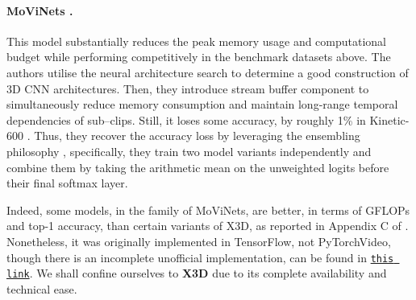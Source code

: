 \paragraph{MoViNets \cite{MoViNets}.} This model substantially reduces the peak memory usage and computational budget while performing competitively in the benchmark datasets above.
The authors utilise the neural architecture search to determine a good construction of 3D CNN architectures. Then, they introduce stream buffer component to simultaneously reduce memory consumption and maintain long-range temporal dependencies of sub–clips.
Still, it loses some accuracy, by roughly 1\% in Kinetic-600 \cite{carreira2018shortnotekinetics600}. Thus, they recover the accuracy loss by leveraging the ensembling philosophy \cite{kondratyuk2020ensembling}, specifically, they train two model variants independently and combine them by taking the arithmetic mean on the unweighted logits before their final softmax layer.

Indeed, some models, in the family of MoViNets, are better, in terms of GFLOPs and top-1 accuracy, than certain variants of X3D, as reported in Appendix C of \cite{MoViNets}.
Nonetheless, it was originally implemented in TensorFlow, not PyTorchVideo, though there is an incomplete unofficial implementation, can be found in \href{https://github.com/Atze00/MoViNet-pytorch.git}{\texttt{this link}}.
We shall confine ourselves to \textbf{X3D} due to its complete availability and technical ease.


